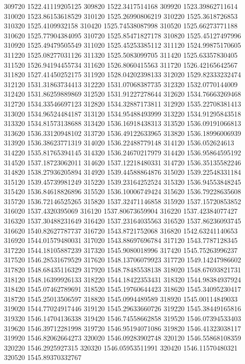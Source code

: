 {309720 1522.41119205125
309820 1522.3417514168
309920 1523.39862711614
310020 1523.86153618529
310120 1525.26990806219
310220 1525.3618726853
310320 1525.4109932158
310420 1525.74538087998
310520 1525.66273771188
310620 1525.77904384095
310720 1525.85471827178
310820 1525.45127497996
310920 1525.49479505549
311020 1525.45253385112
311120 1524.99875170605
311220 1525.08277031126
311320 1525.5083099705
311420 1525.63357830405
311520 1526.94194455734
311620 1526.8060415563
311720 1526.42165642567
311820 1527.41450252175
311920 1528.04202398133
312020 1529.82333232474
312120 1531.31863734413
312220 1531.07068387735
312320 1532.0770144009
312420 1531.86259889869
312520 1531.91227278644
312620 1534.76663269468
312720 1534.33546697123
312820 1534.32887173811
312920 1535.22708381413
313020 1534.96524484187
313120 1534.95488493999
313220 1534.91295843518
313320 1534.81573138688
313420 1536.16918438313
313520 1536.09191066813
313620 1536.33120948102
313720 1536.49122633965
313820 1536.18996006939
313920 1536.38623771319
314020 1536.22488779148
314120 1536.052624613
314220 1535.81765394145
314320 1536.24670217979
314420 1536.95864595192
314520 1537.18723062011
314620 1537.12218480331
314720 1536.35135582246
314820 1538.27936205894
314920 1539.44588864876
315020 1539.22548331184
315120 1539.45739981249
315220 1539.23164252524
315320 1536.94553848245
315420 1536.84618826896
315520 1536.10006749424
315620 1536.79228635608
315720 1536.72146525265
315820 1537.32471146858
315920 1537.15720853852
316020 1537.4320395069
316120 1537.80673659904
316220 1537.42384077427
316320 1537.30488231649
316420 1537.23164035563
316520 1537.86236093745
316620 1540.82627787737
316720 1543.8721752068
316820 1542.63241140653
316920 1544.01579480031
317020 1543.88697696784
317120 1543.7787128345
317220 1544.18105887239
317320 1545.9080018996
317420 1545.75263996237
317520 1546.28531679529
317620 1548.13706079923
317720 1549.14247986602
317820 1548.68435116329
317920 1548.78485538138
318020 1548.67693821731
318120 1548.16399926133
318220 1544.18422353431
318320 1544.98384937924
318420 1545.07462789691
318520 1545.19760644423
318620 1545.34095230417
318720 1545.25013506597
318820 1545.0994489589
318920 1545.00114849033
319020 1544.77024917446
319120 1545.29633660726
319220 1545.38449165816
319320 1546.14704136338
319420 1546.74558662858
319520 1546.07394533403
319620 1546.39712281998
319720 1546.95194071086
319820 1546.41323038117
319920 1546.82062664273
320020 1546.09283902748
320120 1546.55868108359
320220 1546.2925927315
320320 1546.05953511991
320420 1546.11570480321
320520 1545.89370332767
}
